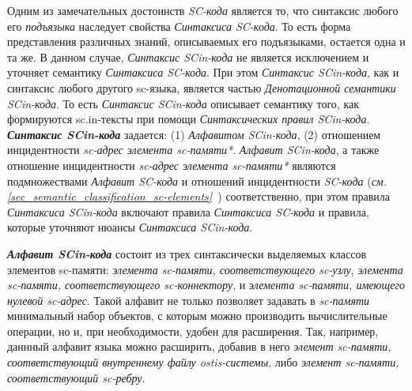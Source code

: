 Одним из замечательных достоинств \textit{SC-кода} является то, что синтаксис любого его \textit{подъязыка} наследует свойства \textit{Синтаксиса SC-кода}. То есть форма представления различных знаний, описываемых его подъязыками, остается одна и та же. В данном случае, \textit{Синтаксис SCin-кода} не является исключением и уточняет семантику \textit{Синтаксиса SC-кода}. При этом \textit{Синтаксис SCin-кода}, как и синтаксис любого другого sc-языка, является частью \textit{Денотационной семантики SCin-кода}. То есть \textit{Синтаксис SCin-кода} описывает семантику того, как формируются sc.in-тексты при помощи \textit{Синтаксических правил SCin-кода}. \textbf{\textit{Синтаксис SCin-кода}} задается: (1) \textit{Алфавитом SCin-кода}, (2) отношением инцидентности \textit{sc-адрес элемента sc-памяти*}. \textit{Алфавит SCin-кода\scnsupergroupsign}, а также отношение инцидентности \textit{sc-адрес элемента sc-памяти*} являются подмножествами \textit{Алфавит SC-кода\scnsupergroupsign} и отношений инцидентности \textit{SC-кода} (\textit{см. \ref{sec_semantic_classification_sc-elements}~}) соответственно, при этом правила \textit{Синтаксиса SCin-кода} включают правила \textit{Синтаксиса SC-кода} и правила, которые уточняют нюансы \textit{Синтаксиса SCin-кода}.

\begin{SCn}
\begin{scneqtoset}
    \begin{scnindent}
    \end{scnindent}
\end{scneqtoset}
\end{SCn}

\textbf{\textit{Алфавит SCin-кода\scnsupergroupsign}} состоит из трех синтаксически выделяемых классов элементов sc-памяти: \textit{элемента sc-памяти, соответствующего sc-узлу}, \textit{элемента sc-памяти, соответствующего sc-коннектору}, и \textit{элемента sc-памяти, имеющего нулевой sc-адрес}. Такой алфавит не только позволяет задавать в \textit{sc-памяти} минимальный набор объектов, с которым можно производить вычислительные операции, но и, при необходимости, удобен для расширения. Так, например, даннный алфавит языка можно расширить, добавив в него \textit{элемент sc-памяти, соответствующий внутреннему файлу ostis-системы}, либо \textit{элемент sc-памяти, соответствующий sc-ребру}.

